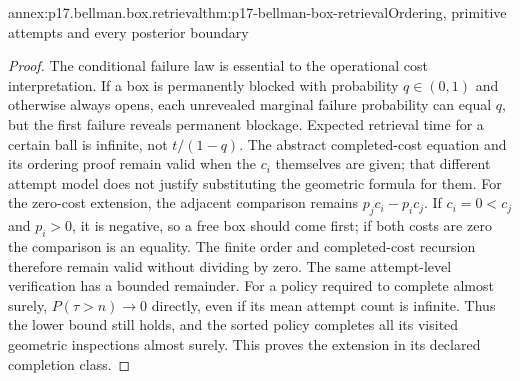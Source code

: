 \begin{annexitem}{annex:p17.bellman.box.retrieval}{thm:p17-bellman-box-retrieval}{Ordering, primitive attempts and every posterior boundary}
\begin{proof}
The conditional failure law is
essential to the operational
cost interpretation. If a box
is permanently blocked with
probability \(q\in(0,1)\)
and otherwise always opens,
each unrevealed marginal
failure probability can equal
\(q\), but the first failure
reveals permanent blockage.
Expected retrieval time for a
certain ball is infinite,
not \(t/(1-q)\).
The abstract completed-cost
equation and its ordering
proof remain valid when
the \(c_i\) themselves are
given; that different attempt
model does not justify
substituting the geometric
formula for them.
For the zero-cost extension, the adjacent
comparison remains \(p_jc_i-p_ic_j\).
If \(c_i=0<c_j\) and \(p_i>0\), it is
negative, so a free box should come first;
if both costs are zero the comparison is
an equality. The finite order and
completed-cost recursion therefore remain
valid without dividing by zero.
The same attempt-level verification has a
bounded remainder. For a policy required
to complete almost surely,
\(P(\tau>n)\to0\) directly, even if its
mean attempt count is infinite. Thus
the lower bound still holds, and the
sorted policy completes all its visited
geometric inspections almost surely.
This proves the extension in its declared
completion class.
\end{proof}
\end{annexitem}

